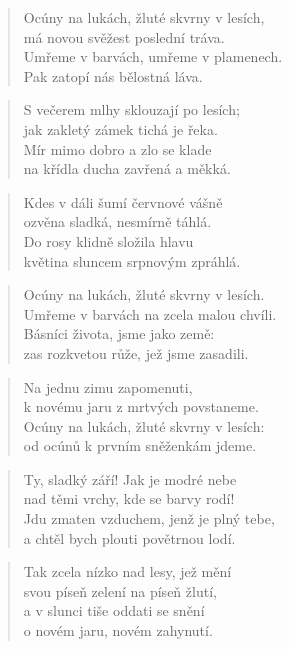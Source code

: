 \documentclass{book}
\begin{document}
\newpage
{}
\begin{verse}
Ocúny na lukách, žluté skvrny v lesích,\\
má novou svěžest poslední tráva.\\
Umřeme v barvách, umřeme v plamenech.\\
Pak zatopí nás bělostná láva.
\end{verse}
\begin{verse}
S večerem mlhy sklouzají po lesích;\\
jak zakletý zámek tichá je řeka.\\
Mír mimo dobro a zlo se klade\\
na křídla ducha zavřená a měkká.
\end{verse}
\begin{verse}
Kdes v dáli šumí červnové vášně\\
ozvěna sladká, nesmírně táhlá.\\
Do rosy klidně složila hlavu\\
květina sluncem srpnovým zpráhlá.
\end{verse}
\begin{verse}
Ocúny na lukách, žluté skvrny v lesích.\\
Umřeme v barvách na zcela malou chvíli.\\
Básníci života, jsme jako země:\\
zas rozkvetou růže, jež jsme zasadili.
\end{verse}
\begin{verse}
Na jednu zimu zapomenuti,\\
k novému jaru z mrtvých povstaneme.\\
Ocúny na lukách, žluté skvrny v lesích:\\
od ocúnů k prvním sněženkám jdeme.
\end{verse}
\newpage
{}
\begin{verse}
Ty, sladký září! Jak je modré nebe\\
nad těmi vrchy, kde se barvy rodí!\\
Jdu zmaten vzduchem, jenž je plný tebe,\\
a chtěl bych plouti povětrnou lodí.
\end{verse}
\begin{verse}
Tak zcela nízko nad lesy, jež mění\\
svou píseň zelení na píseň žlutí,\\
a v slunci tiše oddati se snění\\
o novém jaru, novém zahynutí.
\end{verse}
\end{document}
